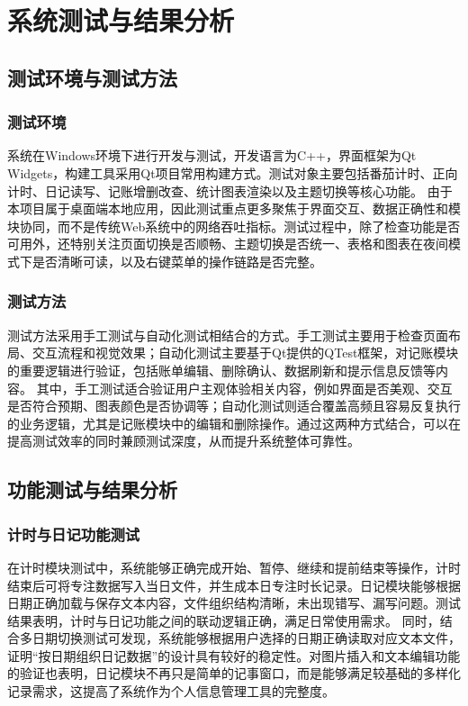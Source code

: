 \chapter{系统测试与结果分析}

\section{测试环境与测试方法}

\subsection{测试环境}
系统在Windows环境下进行开发与测试，开发语言为C++，界面框架为Qt Widgets，构建工具采用Qt项目常用构建方式。测试对象主要包括番茄计时、正向计时、日记读写、记账增删改查、统计图表渲染以及主题切换等核心功能。
由于本项目属于桌面端本地应用，因此测试重点更多聚焦于界面交互、数据正确性和模块协同，而不是传统Web系统中的网络吞吐指标。测试过程中，除了检查功能是否可用外，还特别关注页面切换是否顺畅、主题切换是否统一、表格和图表在夜间模式下是否清晰可读，以及右键菜单的操作链路是否完整。

\subsection{测试方法}
测试方法采用手工测试与自动化测试相结合的方式。手工测试主要用于检查页面布局、交互流程和视觉效果；自动化测试主要基于Qt提供的QTest框架，对记账模块的重要逻辑进行验证，包括账单编辑、删除确认、数据刷新和提示信息反馈等内容。
其中，手工测试适合验证用户主观体验相关内容，例如界面是否美观、交互是否符合预期、图表颜色是否协调等；自动化测试则适合覆盖高频且容易反复执行的业务逻辑，尤其是记账模块中的编辑和删除操作。通过这两种方式结合，可以在提高测试效率的同时兼顾测试深度，从而提升系统整体可靠性。

\section{功能测试与结果分析}

\subsection{计时与日记功能测试}
在计时模块测试中，系统能够正确完成开始、暂停、继续和提前结束等操作，计时结束后可将专注数据写入当日文件，并生成本日专注时长记录。日记模块能够根据日期正确加载与保存文本内容，文件组织结构清晰，未出现错写、漏写问题。测试结果表明，计时与日记功能之间的联动逻辑正确，满足日常使用需求。
同时，结合多日期切换测试可发现，系统能够根据用户选择的日期正确读取对应文本文件，证明“按日期组织日记数据”的设计具有较好的稳定性。对图片插入和文本编辑功能的验证也表明，日记模块不再只是简单的记事窗口，而是能够满足较基础的多样化记录需求，这提高了系统作为个人信息管理工具的完整度。

